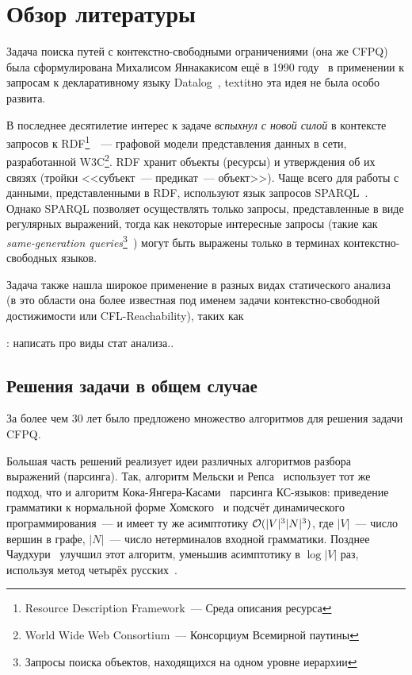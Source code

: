 \section{Обзор литературы}\label{section:voda}

Задача поиска путей с контекстно-свободными ограничениями (она же CFPQ) была сформулирована Михалисом Яннакакисом ещё в 1990 году~\cite{Yannakakis1990} в применении к запросам к декларативному языку Datalog~\cite{DatalogWiki, Ceri1989}, textit{но эта идея не была особо развита}.

В последнее десятилетие интерес к задаче \textit{вспыхнул с новой силой} в контексте запросов к RDF\footnote{Resource Description Framework~--- Среда описания ресурса}~\cite{RDF}~--- графовой модели представления данных в сети, разработанной W3C\footnote{World Wide Web Consortium~--- Консорциум Всемирной паутины}. RDF хранит объекты (ресурсы) и утверждения об их связях (тройки <<субъект~--- предикат~--- объект>>). Чаще всего для работы с данными, представленными в RDF, используют язык запросов SPARQL~\cite{SPARQL}. Однако SPARQL позволяет осуществлять только запросы, представленные в виде регулярных выражений, тогда как некоторые интересные запросы (такие как \textit{same-generation queries}\footnote{Запросы поиска объектов, находящихся на одном уровне иерархии}~\cite{Abiteboul1995}) могут быть выражены только в терминах контекстно-свободных языков.

Задача также нашла широкое применение в разных видах статического анализа~\cite{Reps1998} (в это области она более известная под именем задачи контекстно-свободной достижимости или CFL-Reachability), таких как 

\TODO: написать про виды стат анализа..



\subsection{Решения задачи в общем случае}

За более чем 30 лет было предложено множество алгоритмов для решения задачи CFPQ. 

Большая часть решений реализует идеи различных алгоритмов разбора выражений (парсинга). Так, алгоритм Мельски и Репса~\cite{Reps97} использует тот же подход, что и алгоритм Кока-Янгера-Касами~\cite{Younger1967} парсинга КС-языков: приведение грамматики к нормальной форме Хомского~\cite{Chomsky1957} и подсчёт динамического программирования~--- и имеет ту же асимптотику $\mathcal{O}(|V|^3 |N|^3)$, где $|V|$~--- число вершин в графе, $|N|$~--- число нетерминалов входной грамматики. Позднее Чаудхури~\cite{Chaudhuri06} улучшил этот алгоритм, уменьшив асимптотику в $\log |V|$ раз, используя метод четырёх русских~\cite{Arlazarov70}.

